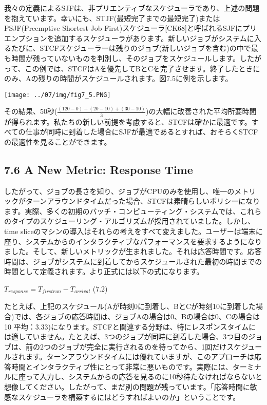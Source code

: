 我々の定義によるSJFは、非プリエンティブなスケジューラであり、上述の問題を抱えています。幸いにも、STJF(最短完了までの最短完了)またはPSJF(Preemptive
Shortest Job
First)スケジューラ{[}CK68{]}と呼ばれるSJFにプリエンプションを追加するスケジューラがあります。新しいジョブがシステムに入るたびに、STCFスケジューラーは残りのジョブ(新しいジョブを含む)の中で最も時間が残っていないものを判別し、そのジョブをスケジュールします。したがって、この例では、STCFはAを優先してBとCを完了させます。終了したときにのみ、Aの残りの時間がスケジュールされます。図7.5に例を示します。

\texttt{[image: ../07/img/fig7\_5.PNG]}

その結果、50秒(\(\frac{(120-0)+(20-10)+(30-10)}{3}\))の大幅に改善された平均所要時間が得られます。私たちの新しい前提を考慮すると、STCFは確かに最適です。すべての仕事が同時に到着した場合にSJFが最適であるとすれば、おそらくSTCFの最適性を見ることができます。

\hypertarget{a-new-metric-response-time}{%
\subsection*{7.6 A New Metric: Response
Time}\label{a-new-metric-response-time}}

したがって、ジョブの長さを知り、ジョブがCPUのみを使用し、唯一のメトリックがターンアラウンドタイムだった場合、STCFは素晴らしいポリシーになります。実際、多くの初期のバッチ・コンピューティング・システムでは、これらのタイプのスケジューリング・アルゴリズムが採用されていました。しかし、time
sliceのマシンの導入はそれらの考えをすべて変えました。ユーザーは端末に座り、システムからのインタラクティブなパフォーマンスを要求するようになりました。そして、新しいメトリックが生まれました。それは応答時間です。応答時間は、ジョブがシステムに到着してからスケジュールされた最初の時間までの時間として定義されます。より正式には以下の式になります。

\(T_{response} = T_{f irstrun}-T_{arrival}\) (7.2)

たとえば、上記のスケジュール(Aが時刻0に到着し、BとCが時刻10に到着した場合)では、各ジョブの応答時間は、ジョブAの場合は0、Bの場合は0、Cの場合は10
平均：3.33)になります。STCFと関連する分野は、特にレスポンスタイムには適していません。たとえば、3つのジョブが同時に到着した場合、3つ目のジョブは、前の2つのジョブが完全に実行されるのを待ってから、1回だけスケジュールされます。ターンアラウンドタイムには優れていますが、このアプローチは応答時間とインタラクティブ性にとって非常に悪いものです。実際には、ターミナルに座って入力し、システムからの応答を見るのに10秒待たなければならないと想像してください。したがって、まだ別の問題が残っています。「応答時間に敏感なスケジューラを構築するにはどうすればよいのか」ということです。

